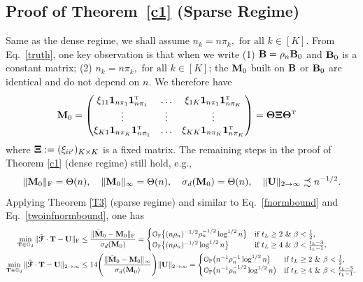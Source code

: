 \documentclass[10pt,journal,compsoc]{IEEEtran}
\newcommand{\op}{\mathcal{O}_{\mathbb{P}}}
\newcommand{\ee}{\end{aligned} \end{equation}}
\newcommand{\bds}{\boldsymbol}
\newcommand{\twoinf}{2\rightarrow \infty}
\newcommand{\T}{\top}
\def\T{{ \mathrm{\scriptscriptstyle T} }} %
\newcommand{\bee}{\begin{equation}\begin{aligned}}
\newcommand{\M}[1]{{{\mathbf{\MakeUppercase{#1}}}}}
\newcommand{\F}{\mathrm{F}}
\numberwithin{equation}{section}
\begin{document}
\subsection{Proof of Theorem~\ref{c1} (Sparse Regime)}\label{pfthm4}
Same as the dense regime, we shall assume $n_k = n\pi_{k}, \text{ for all }k\in [K]$. From Eq.~\eqref{truth}, one key observation is that when we write (1) $\M B = \rho_n \M B_0$ and $\M B_0$ is a constant matrix; (2) $n_k = n\pi_{k}, \text{ for all }k\in [K]$; the ${\M M}_0$ built on $\M B$ or $\M B_0$ are identical and do not depend on $n$. We therefore have
\bee\nonumber
\M M_0	&= \begin{pmatrix}
\xi_{11} \bds 1_{n\pi_1} \bds 1_{n\pi_1}^\T &\dots & \xi_{1K} \bds 1_{n\pi_1} \bds 1_{n\pi_K}^\T\\
\vdots & \vdots & \vdots\\
\xi_{K1} \bds 1_{n\pi_K} \bds 1_{n\pi_1}^\T & \dots & \xi_{KK} \bds 1_{n\pi_K} \bds 1_{n\pi_K}^\T
\end{pmatrix} 
= 
\M \Theta \M \Xi \M \Theta^\T
\ee
where $\M \Xi := (\xi_{ii'})_{K \times K}$ is a fixed matrix. The remaining steps in the proof of Theorem \ref{c1} (dense regime) still hold, e.g., 
\bee\label{MMFF:s}
\|\M M_0\|_\F = \Theta(n), \quad \|\M M_0\|_{\infty} =\Theta(n), \quad \sigma_{d}(\M M_0)=\Theta(n), \quad \|\M U\|_{\twoinf} \precsim n^{-1/2}.
\ee
Applying Theorem \ref{T3} (sparse regime) and similar to Eq.~\eqref{fnormbound} and Eq.~\eqref{twoinfnormbound}, one has
\begin{align}
\label{spectral1a:sparse}
\min_{\M T \in \mathbb{O}_{d}} \|\hat{\bds{\mathcal{F}}} \cdot \mathbf{T} - \mathbf{U}\|_{\F} 
& \leq \frac{\|\tilde{\M M}_0 - \M M_0\|_\F}{\sigma_d(\M M_0)}
=\begin{cases}
\op\big\{(n\rho_n)^{-1/2}\rho_n^{-1/2}\log^{1/2}{n}\big\} & \text{if  } t_L \geq 2 \text{ \& }\beta <\frac{1}{2},
\\\op\big\{(n\rho_n)^{-1/2}\log^{1/2}{n}\big\}& \text{if } t_L \geq 4 \text{ \& }\beta<\frac{t_L - 3}{t_L - 1},
\end{cases} \\
\label{twoinf:sparse}
\min_{\M T \in \mathbb{O}_{d}} \|\hat{\bds{\mathcal{F}}} \cdot \mathbf{T} - \mathbf{U}\|_{\twoinf} 
&\leq 14\Bigg(\frac{\|\tilde{\M M}_0 - \M M_0\|_{\infty}}{\sigma_d(\M M_0)}\Bigg)\|\M U\|_{\twoinf}
=\begin{cases}
\op\big(n^{-1}\rho_n^{-1}\log^{1/2}{n}\big) & \text{if } t_L \geq 2 \text{ \& }\beta <\frac{1}{2},
\\\op\big(n^{-1}\rho_n^{-1/2}\log^{1/2}{n}\big)& \text{if } t_L \geq 4 \text{ \& }\beta<\frac{t_L - 3}{t_L - 1}.
\end{cases}
\end{align}
\end{document}
